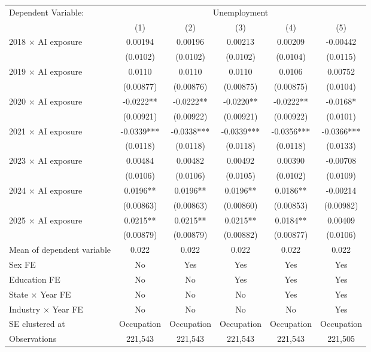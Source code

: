 \def\sym#1{\ifmmode^{#1}\else\(^{#1}\)\fi}
\begin{tabular}{l*{5}{c}}
\toprule
Dependent Variable: & \multicolumn{5}{c}{Unemployment} \\
\cmidrule(lr){2-6}
 & (1) & (2) & (3) & (4) & (5) \\
\midrule
2018 $\times$ AI exposure&     0.00194   &     0.00196   &     0.00213   &     0.00209   &    -0.00442   \\
            &    (0.0102)   &    (0.0102)   &    (0.0102)   &    (0.0104)   &    (0.0115)   \\
2019 $\times$ AI exposure&      0.0110   &      0.0110   &      0.0110   &      0.0106   &     0.00752   \\
            &   (0.00877)   &   (0.00876)   &   (0.00875)   &   (0.00875)   &    (0.0104)   \\
2020 $\times$ AI exposure&     -0.0222** &     -0.0222** &     -0.0220** &     -0.0222** &     -0.0168*  \\
            &   (0.00921)   &   (0.00922)   &   (0.00921)   &   (0.00922)   &    (0.0101)   \\
2021 $\times$ AI exposure&     -0.0339***&     -0.0338***&     -0.0339***&     -0.0356***&     -0.0366***\\
            &    (0.0118)   &    (0.0118)   &    (0.0118)   &    (0.0118)   &    (0.0133)   \\
2023 $\times$ AI exposure&     0.00484   &     0.00482   &     0.00492   &     0.00390   &    -0.00708   \\
            &    (0.0106)   &    (0.0106)   &    (0.0105)   &    (0.0102)   &    (0.0109)   \\
2024 $\times$ AI exposure&      0.0196** &      0.0196** &      0.0196** &      0.0186** &    -0.00214   \\
            &   (0.00863)   &   (0.00863)   &   (0.00860)   &   (0.00853)   &   (0.00982)   \\
2025 $\times$ AI exposure&      0.0215** &      0.0215** &      0.0215** &      0.0184** &     0.00409   \\
            &   (0.00879)   &   (0.00879)   &   (0.00882)   &   (0.00877)   &    (0.0106)   \\
\midrule
Mean of dependent variable&       0.022   &       0.022   &       0.022   &       0.022   &       0.022   \\
Sex FE      &          No   &         Yes   &         Yes   &         Yes   &         Yes   \\
Education FE&          No   &          No   &         Yes   &         Yes   &         Yes   \\
State $\times$ Year FE&          No   &          No   &          No   &         Yes   &         Yes   \\
Industry $\times$ Year FE&          No   &          No   &          No   &          No   &         Yes   \\
SE clustered at&  Occupation   &  Occupation   &  Occupation   &  Occupation   &  Occupation   \\
Observations&     221,543   &     221,543   &     221,543   &     221,543   &     221,505   \\
\bottomrule
\end{tabular}
